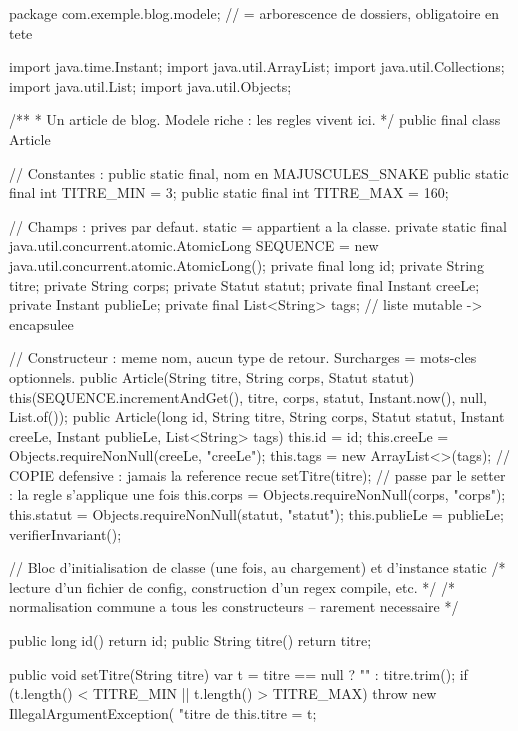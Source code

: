 \documentclass[12pt,a4paper,twoside,openright]{book}
\begin{document}
\begin{codejava}
package com.exemple.blog.modele;                       // = arborescence de dossiers, obligatoire en tete

import java.time.Instant;
import java.util.ArrayList;
import java.util.Collections;
import java.util.List;
import java.util.Objects;

/**
 * Un article de blog. Modele riche : les regles vivent ici.
 */
public final class Article {

    // Constantes : public static final, nom en MAJUSCULES_SNAKE
    public static final int TITRE_MIN = 3;
    public static final int TITRE_MAX = 160;

    // Champs : prives par defaut. static = appartient a la classe.
    private static final java.util.concurrent.atomic.AtomicLong SEQUENCE = new java.util.concurrent.atomic.AtomicLong();
    private final long id;
    private String titre;
    private String corps;
    private Statut statut;
    private final Instant creeLe;
    private Instant publieLe;
    private final List<String> tags;                    // liste mutable -> encapsulee

    // Constructeur : meme nom, aucun type de retour. Surcharges = mots-cles optionnels.
    public Article(String titre, String corps, Statut statut) {
        this(SEQUENCE.incrementAndGet(), titre, corps, statut, Instant.now(), null, List.of());
    }
    public Article(long id, String titre, String corps, Statut statut,
                   Instant creeLe, Instant publieLe, List<String> tags) {
        this.id = id;
        this.creeLe = Objects.requireNonNull(creeLe, "creeLe");
        this.tags = new ArrayList<>(tags);              // COPIE defensive : jamais la reference recue
        setTitre(titre);                                // passe par le setter : la regle s'applique une fois
        this.corps = Objects.requireNonNull(corps, "corps");
        this.statut = Objects.requireNonNull(statut, "statut");
        this.publieLe = publieLe;
        verifierInvariant();
    }

    // Bloc d'initialisation de classe (une fois, au chargement) et d'instance
    static { /* lecture d'un fichier de config, construction d'un regex compile, etc. */ }
    { /* normalisation commune a tous les constructeurs -- rarement necessaire */ }

    public long id() { return id; }
    public String titre() { return titre; }

    public void setTitre(String titre) {
        var t = titre == null ? "" : titre.trim();
        if (t.length() < TITRE_MIN || t.length() > TITRE_MAX) {
            throw new IllegalArgumentException(
                "titre de %
        }
        this.titre = t;
    }

}
\end{codejava}
\end{document}
